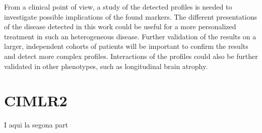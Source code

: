From a clinical point of view, a study of the detected profiles is needed to investigate possible implications of the found markers. The different presentations of the disease detected in this work could be useful for a more personalized treatment in such an heterogeneous disease. Further validation of the results on a larger, independent cohorts of patients will be important to confirm the results and detect more complex profiles. Interactions of the profiles could also be further validated in other phenotypes, such as longitudinal brain atrophy.  \\

\section{CIMLR2}


I aqui la segona part